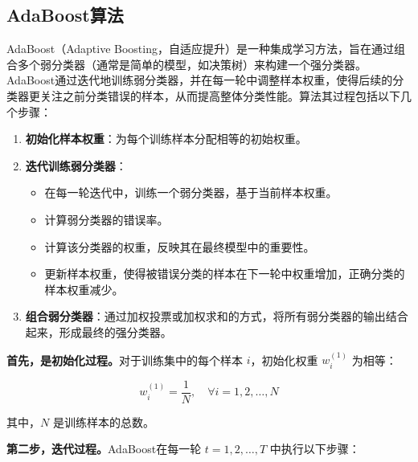 \documentclass[a4paper,11pt,AutoFakeBold]{ctexart}
\begin{document}
\subsection{AdaBoost算法}
AdaBoost（Adaptive Boosting，自适应提升）是一种集成学习方法，旨在通过组合多个弱分类器（通常是简单的模型，如决策树）来构建一个强分类器。AdaBoost通过迭代地训练弱分类器，并在每一轮中调整样本权重，使得后续的分类器更关注之前分类错误的样本，从而提高整体分类性能。算法其过程包括以下几个步骤：

\begin{enumerate}
    \item \textbf{初始化样本权重}：为每个训练样本分配相等的初始权重。
    \item \textbf{迭代训练弱分类器}：
    \begin{itemize}
        \item 在每一轮迭代中，训练一个弱分类器，基于当前样本权重。
        \item 计算弱分类器的错误率。
        \item 计算该分类器的权重，反映其在最终模型中的重要性。
        \item 更新样本权重，使得被错误分类的样本在下一轮中权重增加，正确分类的样本权重减少。
    \end{itemize}
    \item \textbf{组合弱分类器}：通过加权投票或加权求和的方式，将所有弱分类器的输出结合起来，形成最终的强分类器。
\end{enumerate}

\textbf{首先，是初始化过程。}对于训练集中的每个样本 \( i \)，初始化权重 \( w_i^{(1)} \) 为相等：

\begin{equation}
w_i^{(1)} = \frac{1}{N}, \quad \forall i = 1, 2, \dots, N
\end{equation}

其中，\( N \) 是训练样本的总数。

\textbf{第二步，迭代过程。}AdaBoost在每一轮 \( t = 1, 2, \dots, T \) 中执行以下步骤：
\end{document}
